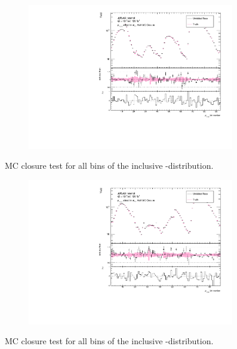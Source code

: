 \begin{figure}[htb]
  \centering
  \begin{subfigure}{.65\textwidth}\centering\includegraphics[width = 0.99\textwidth]{Figures/m4l/UnfoldingStudies/v014_closure/HalfMCClosure_withPull_pt12_m4l.pdf}\end{subfigure}
\caption{MC closure test for all bins of the inclusive \ptZOne-\mFourL distribution.}
 \end{figure}

\begin{figure}[htb]
  \centering
  \begin{subfigure}{.65\textwidth}\centering\includegraphics[width = 0.99\textwidth]{Figures/m4l/UnfoldingStudies/v014_closure/HalfMCClosure_withPull_pt34_m4l.pdf}\end{subfigure}
\caption{MC closure test for all bins of the inclusive \ptZTwo-\mFourL distribution.}
 \end{figure}

